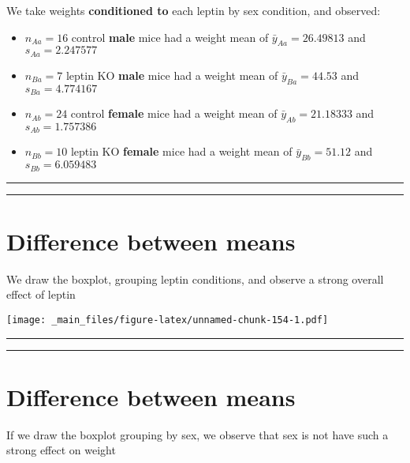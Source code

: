 \documentclass[
]{book}
\begin{document}
We take weights \textbf{conditioned to} each leptin by sex condition, and observed:

\begin{itemize}
\item
  \(n_{Aa}=16\) control \textbf{male} mice had a weight mean of \(\bar{y}_{Aa}=26.49813\) and \(s_{Aa}=2.247577\)
\item
  \(n_{Ba}=7\) leptin KO \textbf{male} mice had a weight mean of \(\bar{y}_{Ba}=44.53\) and \(s_{Ba}=4.774167\)
\item
  \(n_{Ab}=24\) control \textbf{female} mice had a weight mean of \(\bar{y}_{Ab}=21.18333\) and \(s_{Ab}=1.757386\)
\item
  \(n_{Bb}=10\) leptin KO \textbf{female} mice had a weight mean of \(\bar{y}_{Bb}=51.12\) and \(s_{Bb}=6.059483\)
\end{itemize}

\begin{center}\rule{0.5\linewidth}{0.5pt}\end{center}

\begin{center}\rule{0.5\linewidth}{0.5pt}\end{center}

\hypertarget{difference-between-means-11}{%
\section{Difference between means}\label{difference-between-means-11}}

We draw the boxplot, grouping leptin conditions, and observe a strong overall effect of leptin

\texttt{[image: \_main\_files/figure-latex/unnamed-chunk-154-1.pdf]}

\begin{center}\rule{0.5\linewidth}{0.5pt}\end{center}

\begin{center}\rule{0.5\linewidth}{0.5pt}\end{center}

\hypertarget{difference-between-means-12}{%
\section{Difference between means}\label{difference-between-means-12}}

If we draw the boxplot grouping by sex, we observe that sex is not have such a strong effect on weight
\end{document}
